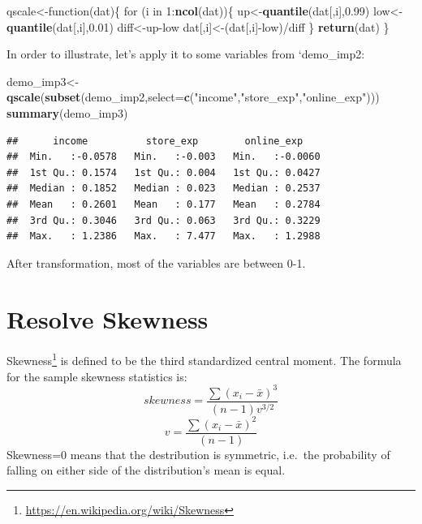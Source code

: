 \documentclass[12pt,]{krantz}
\newenvironment{Shaded}{\begin{snugshade}}{\end{snugshade}}
\newcommand{\KeywordTok}[1]{\textcolor[rgb]{0.13,0.29,0.53}{\textbf{{#1}}}}
\newcommand{\DataTypeTok}[1]{\textcolor[rgb]{0.13,0.29,0.53}{{#1}}}
\newcommand{\DecValTok}[1]{\textcolor[rgb]{0.00,0.00,0.81}{{#1}}}
\newcommand{\FloatTok}[1]{\textcolor[rgb]{0.00,0.00,0.81}{{#1}}}
\newcommand{\StringTok}[1]{\textcolor[rgb]{0.31,0.60,0.02}{{#1}}}
\newcommand{\NormalTok}[1]{{#1}}
\renewcommand{\href}[2]{#2\footnote{\url{#1}}}
\theoremstyle{definition}
\theoremstyle{definition}
\theoremstyle{remark}
\begin{document}
\begin{Shaded}
\begin{Highlighting}[]
\NormalTok{qscale<-function(dat)\{}
  \NormalTok{for (i in }\DecValTok{1}\NormalTok{:}\KeywordTok{ncol}\NormalTok{(dat))\{}
    \NormalTok{up<-}\KeywordTok{quantile}\NormalTok{(dat[,i],}\FloatTok{0.99}\NormalTok{)}
    \NormalTok{low<-}\KeywordTok{quantile}\NormalTok{(dat[,i],}\FloatTok{0.01}\NormalTok{)}
    \NormalTok{diff<-up-low}
    \NormalTok{dat[,i]<-(dat[,i]-low)/diff}
  \NormalTok{\}}
  \KeywordTok{return}\NormalTok{(dat)}
\NormalTok{\}}
\end{Highlighting}
\end{Shaded}

In order to illustrate, let's apply it to some variables from
`demo\_imp2:

\begin{Shaded}
\begin{Highlighting}[]
\NormalTok{demo_imp3<-}\KeywordTok{qscale}\NormalTok{(}\KeywordTok{subset}\NormalTok{(demo_imp2,}\DataTypeTok{select=}\KeywordTok{c}\NormalTok{(}\StringTok{"income"}\NormalTok{,}\StringTok{"store_exp"}\NormalTok{,}\StringTok{"online_exp"}\NormalTok{)))}
\KeywordTok{summary}\NormalTok{(demo_imp3)}
\end{Highlighting}
\end{Shaded}

\begin{verbatim}
##      income          store_exp        online_exp     
##  Min.   :-0.0578   Min.   :-0.003   Min.   :-0.0060  
##  1st Qu.: 0.1574   1st Qu.: 0.004   1st Qu.: 0.0427  
##  Median : 0.1852   Median : 0.023   Median : 0.2537  
##  Mean   : 0.2601   Mean   : 0.177   Mean   : 0.2784  
##  3rd Qu.: 0.3046   3rd Qu.: 0.063   3rd Qu.: 0.3229  
##  Max.   : 1.2386   Max.   : 7.477   Max.   : 1.2988
\end{verbatim}

After transformation, most of the variables are between 0-1.

\section{Resolve Skewness}\label{resolve-skewness}

\href{https://en.wikipedia.org/wiki/Skewness}{Skewness} is defined to be
the third standardized central moment. The formula for the sample
skewness statistics is:
\[ skewness=\frac{\sum(x_{i}-\bar{x})^{3}}{(n-1)v^{3/2}}\]
\[v=\frac{\sum(x_{i}-\bar{x})^{2}}{(n-1)}\] Skewness=0 means that the
destribution is symmetric, i.e.~the probability of falling on either
side of the distribution's mean is equal.
\end{document}
